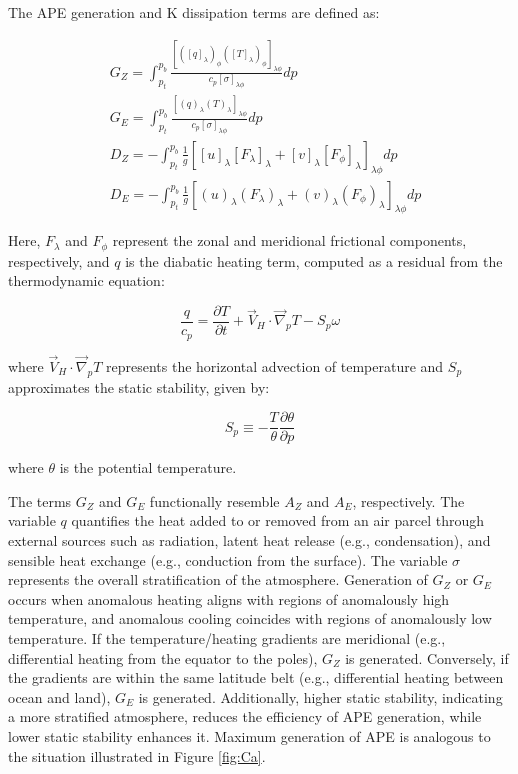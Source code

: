 The APE generation and K dissipation terms are defined as:

\begin{align}
    &G_Z =  \int_{p_t}^{p_b} \frac{[([q]_\lambda)_\phi ([T]_\lambda)_\phi]_{\lambda \phi}}{c_p[\sigma]_{\lambda \phi}} dp \\
    &G_E =  \int_{p_t}^{p_b} \frac{[(q)_\lambda (T)_\lambda]_{\lambda \phi}}{c_p[\sigma]_{\lambda \phi}} dp \\
    &D_Z = -  \int_{p_t}^{p_b} \frac{1}{g} [[u]_\lambda [F_\lambda]_\lambda + [v]_\lambda [F_\phi]_\lambda]_{\lambda \phi} dp \\
    &D_E = -  \int_{p_t}^{p_b} \frac{1}{g} [(u)_\lambda (F_\lambda)_\lambda + (v)_\lambda (F_\phi)_\lambda]_{\lambda \phi} dp
\end{align}

Here, $F_{\lambda}$ and $F_{\phi}$ represent the zonal and meridional frictional components, respectively, and $q$ is the diabatic heating term, computed as a residual from the thermodynamic equation:

\begin{equation}
    \frac{q}{c_p} = \frac{\partial T}{\partial t} + \Vec{V}_H \cdot \Vec{\nabla}_p T - S_p\omega
\end{equation}

where $\Vec{V}_H \cdot \Vec{\nabla}_p T$ represents the horizontal advection of temperature and $S_p$ approximates the static stability, given by:

\begin{equation}
    S_p \equiv -\frac{T}{\theta}\frac{\partial \theta}{\partial p}
\end{equation}

where $\theta$ is the potential temperature. 

The terms \( G_Z \) and \( G_E \) functionally resemble \( A_Z \) and \( A_E \), respectively. The variable \( q \) quantifies the heat added to or removed from an air parcel through external sources such as radiation, latent heat release (e.g., condensation), and sensible heat exchange (e.g., conduction from the surface). The variable \( \sigma \) represents the overall stratification of the atmosphere. Generation of \( G_Z \) or \( G_E \) occurs when anomalous heating aligns with regions of anomalously high temperature, and anomalous cooling coincides with regions of anomalously low temperature. If the temperature/heating gradients are meridional (e.g., differential heating from the equator to the poles), \( G_Z \) is generated. Conversely, if the gradients are within the same latitude belt (e.g., differential heating between ocean and land), \( G_E \) is generated. Additionally, higher static stability, indicating a more stratified atmosphere, reduces the efficiency of APE generation, while lower static stability enhances it. Maximum generation of APE is analogous to the situation illustrated in Figure \ref{fig:Ca}.

